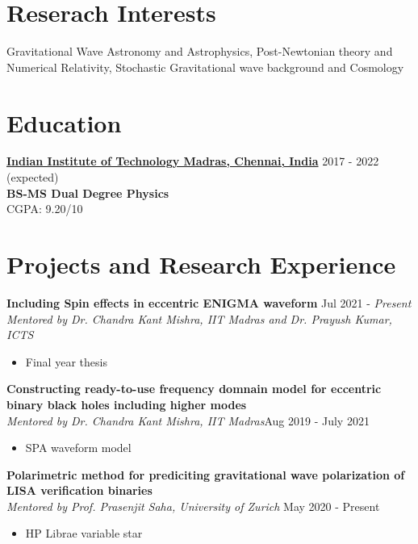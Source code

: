 \documentclass[margin, centered]{res}
\begin{document}
\begin{resume}

\section{Reserach Interests}
Gravitational Wave Astronomy and Astrophysics, Post-Newtonian theory and Numerical Relativity, Stochastic Gravitational wave background and Cosmology
\\
\section{Education}


\textbf{\href{https://www.iitm.ac.in/}{Indian Institute of Technology Madras, Chennai, India}} \hfill 2017 - 2022 (expected) \\
\textbf{BS-MS Dual Degree Physics} \\
CGPA: 9.20/10
\section{Projects and Research Experience}


\textbf{Including Spin effects in eccentric ENIGMA waveform} \hfill Jul 2021 - \textit{Present}\\
\emph{Mentored by Dr. Chandra Kant Mishra, IIT Madras and Dr. Prayush Kumar, ICTS}
\begin{itemize}[leftmargin=*]
    \item Final year thesis
\end{itemize}

\textbf{Constructing ready-to-use frequency domnain model for eccentric binary black holes including higher modes} \\
\emph{Mentored by Dr. Chandra Kant Mishra, IIT Madras}\hfill Aug 2019 - July 2021
\begin{itemize}[leftmargin=*]
    \item SPA waveform model
\end{itemize}

\textbf{Polarimetric method for prediciting gravitational wave polarization of LISA verification binaries} \\
\emph{Mentored by Prof. Prasenjit Saha, University of Zurich }\hfill May 2020 - Present
\begin{itemize}[leftmargin=*]
    \item HP Librae variable star
\end{itemize}


\end{resume}
\end{document}
